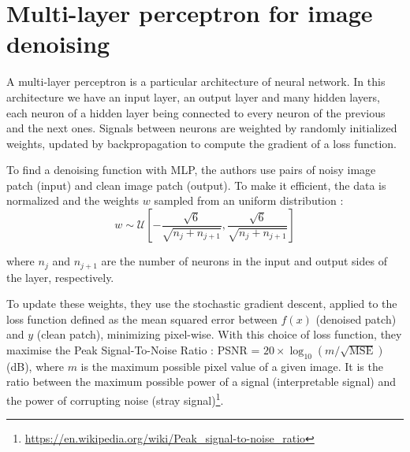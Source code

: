 \documentclass[10pt,a4paper]{article}
\newcommand{\svs}{\vspace{9pt}}
\begin{document}





\section{Multi-layer perceptron for image denoising}

A multi-layer perceptron is a particular architecture of neural network. In this architecture we have an input layer, an output layer and many hidden layers, each neuron of a hidden layer being connected to every neuron of the previous and the next ones. Signals between neurons are weighted by randomly initialized weights, updated by backpropagation to compute the gradient of a loss function.

\svs

To find a denoising function with MLP, the authors use pairs of noisy image patch (input) and clean image patch (output). To make it efficient, the data is normalized and the weights $w$ sampled from an uniform distribution :  \\%
$$w \sim \mathcal{U}\left[-\frac{\sqrt{6}}{\sqrt{n_j + n_{j+1}}}, \frac{\sqrt{6}}{\sqrt{n_j + n_{j+1}}}\right]$$ 

\svs
where $n_j$ and $n_{j+1}$ are the number of neurons in the input and output sides of the layer, respectively.

\svs

To update these weights, they use the stochastic gradient descent, applied to the loss function defined as the mean squared error between $f(x)$ (denoised patch) and $y$ (clean patch), minimizing pixel-wise. With this choice of loss function, they maximise the Peak Signal-To-Noise Ratio : PSNR = $20 \times \log_{10}(m/\sqrt{\mathrm{MSE}})$ (dB), where $m$ is the maximum possible pixel value of a given image. It is the ratio between the maximum possible power of a signal (interpretable signal) and the power of corrupting noise (stray signal)\footnote{\href{https://en.wikipedia.org/wiki/Peak\_signal-to-noise\_ratio}{https://en.wikipedia.org/wiki/Peak\_signal-to-noise\_ratio}}.
\end{document}
